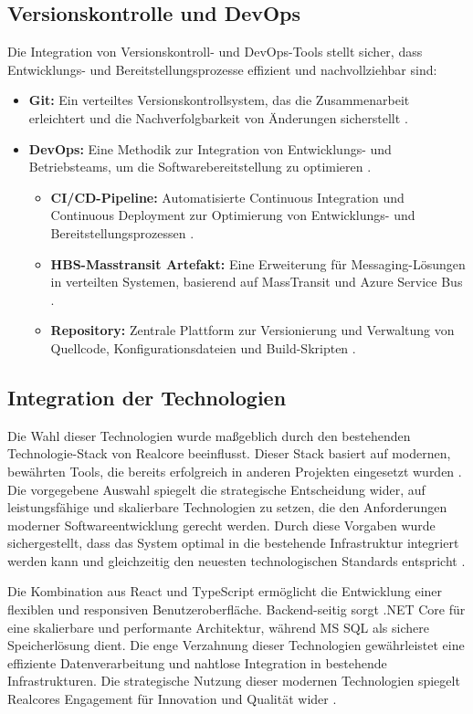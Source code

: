 \subsection*{Versionskontrolle und DevOps}
Die Integration von Versionskontroll- und DevOps-Tools stellt sicher, dass Entwicklungs- und Bereitstellungsprozesse effizient und nachvollziehbar sind:
\begin{itemize}
    \item \textbf{Git:}  
    Ein verteiltes Versionskontrollsystem, das die Zusammenarbeit erleichtert und die Nachverfolgbarkeit von Änderungen sicherstellt \cite{chacon2021git, loeliger2012git}.
    \item \textbf{DevOps:}  
    Eine Methodik zur Integration von Entwicklungs- und Betriebsteams, um die Softwarebereitstellung zu optimieren \cite{azureDevOps, kim2020devops}.
    \begin{itemize}
        \item \textbf{CI/CD-Pipeline:}  
        Automatisierte Continuous Integration und Continuous Deployment zur Optimierung von Entwicklungs- und Bereitstellungsprozessen \cite{fowler2020continuous}.
        \item \textbf{HBS-Masstransit Artefakt:}  
        Eine Erweiterung für Messaging-Lösungen in verteilten Systemen, basierend auf MassTransit und Azure Service Bus \cite{masstransit2021, masstransitAzure2022}.
        \item \textbf{Repository:}  
        Zentrale Plattform zur Versionierung und Verwaltung von Quellcode, Konfigurationsdateien und Build-Skripten \cite{azureRepos2023}.
    \end{itemize}
\end{itemize}

\subsection*{Integration der Technologien}
Die Wahl dieser Technologien wurde maßgeblich durch den bestehenden Technologie-Stack von Realcore beeinflusst. Dieser Stack basiert auf modernen, bewährten Tools, die bereits erfolgreich in anderen Projekten eingesetzt wurden \cite{chhajed2015elk, wilson2018mern}. Die vorgegebene Auswahl spiegelt die strategische Entscheidung wider, auf leistungsfähige und skalierbare Technologien zu setzen, die den Anforderungen moderner Softwareentwicklung gerecht werden. Durch diese Vorgaben wurde sichergestellt, dass das System optimal in die bestehende Infrastruktur integriert werden kann und gleichzeitig den neuesten technologischen Standards entspricht \cite{sharma2018fullstack}.

Die Kombination aus React und TypeScript ermöglicht die Entwicklung einer flexiblen und responsiven Benutzeroberfläche. Backend-seitig sorgt .NET Core für eine skalierbare und performante Architektur, während MS SQL als sichere Speicherlösung dient. Die enge Verzahnung dieser Technologien gewährleistet eine effiziente Datenverarbeitung und nahtlose Integration in bestehende Infrastrukturen. Die strategische Nutzung dieser modernen Technologien spiegelt Realcores Engagement für Innovation und Qualität wider \cite{mccreary2009xrx}.